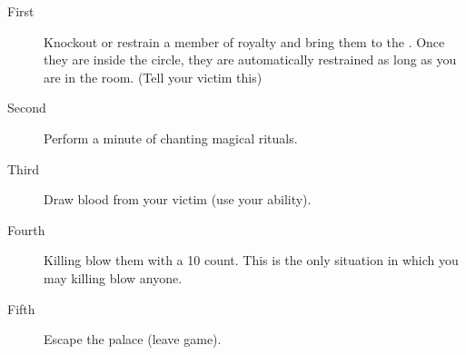 \documentclass[green]{NeptuneBall}
\begin{document}
\begin{description}
\item[First] Knockout or restrain a member of royalty and bring them to the \sRunicCircle{}. Once they are inside the circle, they are automatically restrained as long as you are in the room. (Tell your victim this)
\item[Second] Perform a minute of chanting magical rituals.
\item[Third] Draw blood from your victim (use your ability).
\item[Fourth] Killing blow them with a 10 count. This is the only situation in which you may killing blow anyone.
\item[Fifth] Escape the palace (leave game).
\end{description}
\end{document}
